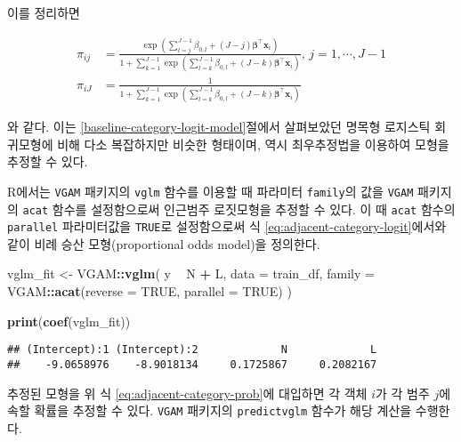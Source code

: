 \documentclass[]{book}
\newenvironment{Shaded}{\begin{snugshade}}{\end{snugshade}}
\newcommand{\DataTypeTok}[1]{\textcolor[rgb]{0.13,0.29,0.53}{#1}}
\newcommand{\KeywordTok}[1]{\textcolor[rgb]{0.13,0.29,0.53}{\textbf{#1}}}
\newcommand{\NormalTok}[1]{#1}
\newcommand{\OperatorTok}[1]{\textcolor[rgb]{0.81,0.36,0.00}{\textbf{#1}}}
\newcommand{\OtherTok}[1]{\textcolor[rgb]{0.56,0.35,0.01}{#1}}
\newcommand{\StringTok}[1]{\textcolor[rgb]{0.31,0.60,0.02}{#1}}
\begin{document}
이를 정리하면

\begin{equation}
\begin{split}
\pi_{ij} &= \frac{\exp \left( \sum_{l = j}^{J - 1} \beta_{0,l} + (J - j) \boldsymbol\beta^\top \mathbf{x}_i \right)}{1 + \sum_{k = 1}^{J - 1} \exp \left( \sum_{l = k}^{J - 1} \beta_{0,l} + (J - k) \boldsymbol\beta^\top \mathbf{x}_i \right)}, \, j = 1, \cdots, J - 1\\
\pi_{iJ} &= \frac{1}{1 + \sum_{k = 1}^{J - 1} \exp \left( \sum_{l = k}^{J - 1} \beta_{0,l} + (J - k) \boldsymbol\beta^\top \mathbf{x}_i \right)}
\end{split}
\label{eq:adjacent-category-prob}
\end{equation}

와 같다. 이는 \ref{baseline-category-logit-model}절에서 살펴보았던 명목형 로지스틱 회귀모형에 비해 다소 복잡하지만 비슷한 형태이며, 역시 최우추정법을 이용하여 모형을 추정할 수 있다.

R에서는 \texttt{VGAM} 패키지의 \texttt{vglm} 함수를 이용할 때 파라미터 \texttt{family}의 값을 \texttt{VGAM} 패키지의 \texttt{acat} 함수를 설정함으로써 인근범주 로짓모형을 추정할 수 있다. 이 때 \texttt{acat} 함수의 \texttt{parallel} 파라미터값을 \texttt{TRUE}로 설정함으로써 식 \eqref{eq:adjacent-category-logit}에서와 같이 비례 승산 모형(proportional odds model)을 정의한다.

\begin{Shaded}
\begin{Highlighting}[]
\NormalTok{vglm_fit <-}\StringTok{ }\NormalTok{VGAM}\OperatorTok{::}\KeywordTok{vglm}\NormalTok{(}
\NormalTok{  y }\OperatorTok{~}\StringTok{ }\NormalTok{N }\OperatorTok{+}\StringTok{ }\NormalTok{L,}
  \DataTypeTok{data =}\NormalTok{ train_df,}
  \DataTypeTok{family =}\NormalTok{ VGAM}\OperatorTok{::}\KeywordTok{acat}\NormalTok{(}\DataTypeTok{reverse =} \OtherTok{TRUE}\NormalTok{, }\DataTypeTok{parallel =} \OtherTok{TRUE}\NormalTok{)}
\NormalTok{  )}

\KeywordTok{print}\NormalTok{(}\KeywordTok{coef}\NormalTok{(vglm_fit))}
\end{Highlighting}
\end{Shaded}

\begin{verbatim}
## (Intercept):1 (Intercept):2             N             L 
##    -9.0658976    -8.9018134     0.1725867     0.2082167
\end{verbatim}

추정된 모형을 위 식 \eqref{eq:adjacent-category-prob}에 대입하면 각 객체 \(i\)가 각 범주 \(j\)에 속할 확률을 추정할 수 있다. \texttt{VGAM} 패키지의 \texttt{predictvglm} 함수가 해당 계산을 수행한다.
\end{document}
